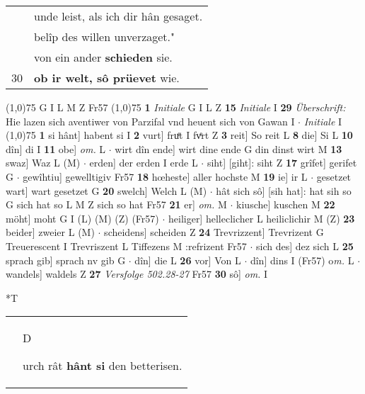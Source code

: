 \documentclass[8pt,a4paper,notitlepage]{article}
\begin{document}
\begin{table}[ht]
\begin{minipage}[t]{0.5\linewidth}
\begin{tabular}{rl}
 & unde leist, als ich dir hân gesaget.\\ 
 & belîp des willen unverzaget."\\ 
 & von ein ander \textbf{schieden} sie.\\ 
30 & \textbf{ob ir welt, sô prüevet} wie.\\ 
\end{tabular}
\scriptsize
\line(1,0){75} \newline
G I L M Z Fr57 \newline
\line(1,0){75} \newline
\textbf{1} \textit{Initiale} G I L Z  \textbf{15} \textit{Initiale} I  \textbf{29} \textit{Überschrift:} Hie lazen sich aventiwer von Parzifal vnd heuent sich von Gawan I   $\cdot$ \textit{Initiale} I  \newline
\line(1,0){75} \newline
\textbf{1} si hânt] habent si I \textbf{2} vurt] fruͤt I fvͤrt Z \textbf{3} reit] So reit L \textbf{8} die] Si L \textbf{10} dîn] di I \textbf{11} obe] \textit{om.} L  $\cdot$ wirt dîn ende] wirt dine ende G din dinst wirt M \textbf{13} swaz] Waz L (M)  $\cdot$ erden] der erden I erde L  $\cdot$ siht] [giht]: siht Z \textbf{17} grîfet] gerifet G  $\cdot$ gewîhtiu] gewelltigiv Fr57 \textbf{18} hœheste] aller hochste M \textbf{19} ie] ir L  $\cdot$ gesetzet wart] wart gesetzet G \textbf{20} swelch] Welch L (M)  $\cdot$ hât sich sô] [sih hat]: hat sih so G sich hat so L M Z sich so hat Fr57 \textbf{21} er] \textit{om.} M  $\cdot$ kiusche] kuschen M \textbf{22} möht] moht G I (L) (M) (Z) (Fr57)  $\cdot$ heiliger] helleclicher L heiliclichir M (Z) \textbf{23} beider] zweier L (M)  $\cdot$ scheidens] scheiden Z \textbf{24} Trevrizzent] Trevrizent G Treuerescent I Trevriszent L Tiffezens M :refrizent Fr57  $\cdot$ sich des] dez sich L \textbf{25} sprach gib] sprach nv gib G  $\cdot$ dîn] die L \textbf{26} vor] Von L  $\cdot$ dîn] dins I (Fr57) o\textit{m. } L  $\cdot$ wandels] waldels Z \textbf{27} \textit{Versfolge 502.28-27} Fr57  \textbf{30} sô] \textit{om.} I \newline
\end{minipage}
\hspace{0.5cm}
\begin{minipage}[t]{0.5\linewidth}
\small
\begin{center}*T
\end{center}
\begin{tabular}{rl}
 & \begin{large}D\end{large}urch rât \textbf{hânt si} den betterisen.\\ 

\end{tabular}
\end{minipage}
\end{table}
\end{document}
